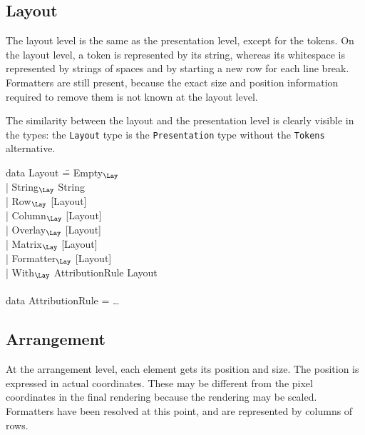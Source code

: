 %																
\subsection{Layout}

The layout level is the same as the presentation level, except for the tokens. On the layout level, a token is represented by its string, whereas its whitespace is represented by strings of spaces and by starting a new row for each line break. Formatters are still present, because the exact size and position information required to remove them is not known at the layout level.

The similarity between the layout and the presentation level is clearly visible in the types: the {\tt Layout} type is the {\tt Presentation} type without the {\tt Tokens} alternative.

\noindent
\ttfamily
\begin{tabbing}
data Layout \= = Empty$_{\Lay}$\\
            \> | String$_{\Lay}$ String \\
            \> | Row$_{\Lay}$ [Layout]\\
            \> | Column$_{\Lay}$ [Layout]\\
            \> | Overlay$_{\Lay}$ [Layout]\\
            \> | Matrix$_{\Lay}$ [Layout]\\
            \> | Formatter$_{\Lay}$ [Layout]\\
            \> | With$_{\Lay}$ AttributionRule Layout\\
\\
data AttributionRule = \dots\\
\end{tabbing}
\rmfamily


%																
\subsection{Arrangement}

At the arrangement level, each element gets its position and size. The position is expressed in actual coordinates. These may be different from the pixel coordinates in the final rendering because the rendering may be scaled. Formatters have been resolved at this point, and are represented by columns of rows.


